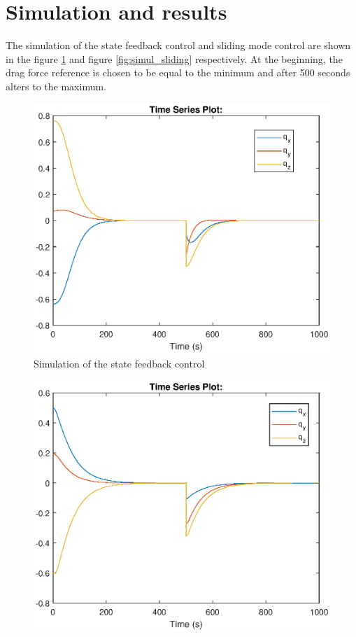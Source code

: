 \section{Simulation and results}
The simulation of the state feedback control and sliding mode control are shown in the figure \ref{fig:simul_sta} and figure \ref{fig:simul_sliding} respectively. At the beginning, the drag force reference is chosen to be equal to the minimum and after 500 seconds alters to the maximum. 
\begin{table}[H]
\begin{minipage}[b]{0.49\linewidth}
	\centering
	\begin{figure}[H]
		\centering
		\includegraphics[width=1.1\linewidth]{figures/test_state_feedback.eps}
		\caption{ Simulation of the state feedback control}
		\label{fig:simul_sta}
	\end{figure}
\end{minipage}\hfill
\begin{minipage}[b]{0.49\linewidth}
	\centering
	\begin{figure}[H]
		\centering
		\includegraphics[width=1.1\linewidth]{figures/test_sliding.eps}

\end{figure}
\end{minipage}
\end{table}
